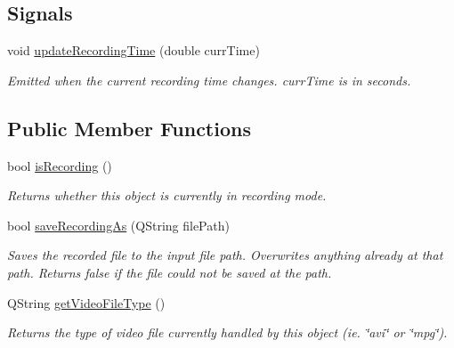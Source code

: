 \subsection*{Signals}
\begin{DoxyCompactItemize}
\item 
\hypertarget{class_picto_1_1_recording_visual_target_host_a6741c9315f51e47d8a1adf08d57f3d41}{void \hyperlink{class_picto_1_1_recording_visual_target_host_a6741c9315f51e47d8a1adf08d57f3d41}{update\-Recording\-Time} (double curr\-Time)}\label{class_picto_1_1_recording_visual_target_host_a6741c9315f51e47d8a1adf08d57f3d41}

\begin{DoxyCompactList}\small\item\em Emitted when the current recording time changes. curr\-Time is in seconds. \end{DoxyCompactList}\end{DoxyCompactItemize}
\subsection*{Public Member Functions}
\begin{DoxyCompactItemize}
\item 
\hypertarget{class_picto_1_1_recording_visual_target_host_aef983c1915dc75e47a7626664484a13d}{bool \hyperlink{class_picto_1_1_recording_visual_target_host_aef983c1915dc75e47a7626664484a13d}{is\-Recording} ()}\label{class_picto_1_1_recording_visual_target_host_aef983c1915dc75e47a7626664484a13d}

\begin{DoxyCompactList}\small\item\em Returns whether this object is currently in recording mode. \end{DoxyCompactList}\item 
\hypertarget{class_picto_1_1_recording_visual_target_host_ae08f1371672e8d376865b8e9ba2f9d22}{bool \hyperlink{class_picto_1_1_recording_visual_target_host_ae08f1371672e8d376865b8e9ba2f9d22}{save\-Recording\-As} (Q\-String file\-Path)}\label{class_picto_1_1_recording_visual_target_host_ae08f1371672e8d376865b8e9ba2f9d22}

\begin{DoxyCompactList}\small\item\em Saves the recorded file to the input file path. Overwrites anything already at that path. Returns false if the file could not be saved at the path. \end{DoxyCompactList}\item 
\hypertarget{class_picto_1_1_recording_visual_target_host_a489ff489ecd55ec6efcbfb470c69fcb8}{Q\-String \hyperlink{class_picto_1_1_recording_visual_target_host_a489ff489ecd55ec6efcbfb470c69fcb8}{get\-Video\-File\-Type} ()}\label{class_picto_1_1_recording_visual_target_host_a489ff489ecd55ec6efcbfb470c69fcb8}

\begin{DoxyCompactList}\small\item\em Returns the type of video file currently handled by this object (ie. \char`\"{}avi\char`\"{} or \char`\"{}mpg\char`\"{}). \end{DoxyCompactList}\end{DoxyCompactItemize}
